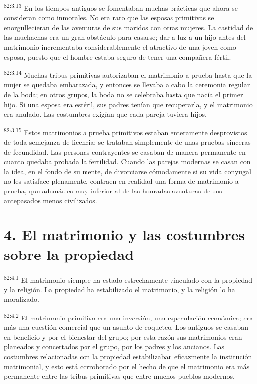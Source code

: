 \par
\textsuperscript{82:3.13} En los tiempos antiguos se fomentaban muchas prácticas que ahora se consideran como inmorales. No era raro que las esposas primitivas se enorgullecieran de las aventuras de sus maridos con otras mujeres. La castidad de las muchachas era un gran obstáculo para casarse; dar a luz a un hijo antes del matrimonio incrementaba considerablemente el atractivo de una joven como esposa, puesto que el hombre estaba seguro de tener una compañera fértil.

\par
\textsuperscript{82:3.14} Muchas tribus primitivas autorizaban el matrimonio a prueba hasta que la mujer se quedaba embarazada, y entonces se llevaba a cabo la ceremonia regular de la boda; en otros grupos, la boda no se celebraba hasta que nacía el primer hijo. Si una esposa era estéril, sus padres tenían que recuperarla, y el matrimonio era anulado. Las costumbres exigían que cada pareja tuviera hijos.

\par
\textsuperscript{82:3.15} Estos matrimonios a prueba primitivos estaban enteramente desprovistos de toda semejanza de licencia; se trataban simplemente de unas pruebas sinceras de fecundidad. Las personas contrayentes se casaban de manera permanente en cuanto quedaba probada la fertilidad. Cuando las parejas modernas se casan con la idea, en el fondo de su mente, de divorciarse cómodamente si su vida conyugal no les satisface plenamente, contraen en realidad una forma de matrimonio a prueba, que además es muy inferior al de las honradas aventuras de sus antepasados menos civilizados.

\section*{4. El matrimonio y las costumbres sobre la propiedad}
\par
\textsuperscript{82:4.1} El matrimonio siempre ha estado estrechamente vinculado con la propiedad y la religión. La propiedad ha estabilizado el matrimonio, y la religión lo ha moralizado.

\par
\textsuperscript{82:4.2} El matrimonio primitivo era una inversión, una especulación económica; era más una cuestión comercial que un asunto de coqueteo. Los antiguos se casaban en beneficio y por el bienestar del grupo; por esta razón sus matrimonios eran planeados y concertados por el grupo, por los padres y los ancianos. Las costumbres relacionadas con la propiedad estabilizaban eficazmente la institución matrimonial, y esto está corroborado por el hecho de que el matrimonio era más permanente entre las tribus primitivas que entre muchos pueblos modernos.


